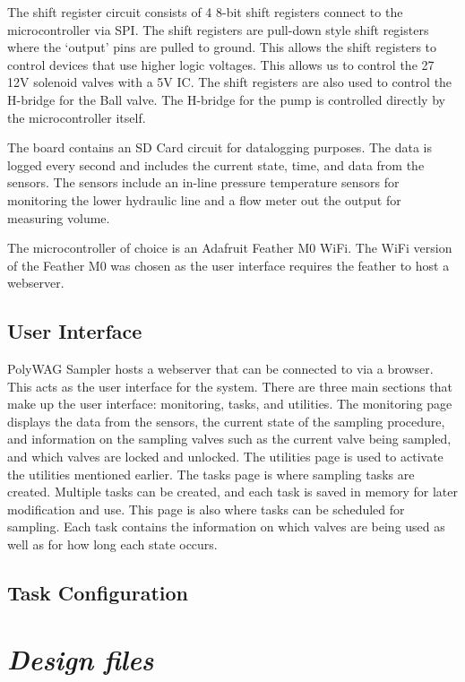 \documentclass[11pt, letterpaper]{article}
\begin{document}
The shift register circuit consists of 4 8-bit shift registers connect to the microcontroller via SPI. The shift registers are pull-down style shift registers where the ‘output’ pins are pulled to ground. This allows the shift registers to control devices that use higher logic voltages. This allows us to control the 27 12V solenoid valves with a 5V IC. The shift registers are also used to control the H-bridge for the Ball valve. The H-bridge for the pump is controlled directly by the microcontroller itself. 

The board contains an SD Card circuit for datalogging purposes. The data is logged every second and includes the current state, time, and data from the sensors. The sensors include an in-line pressure temperature sensors for monitoring the lower hydraulic line and a flow meter out the output for measuring volume.

The microcontroller of choice is an Adafruit Feather M0 WiFi. The WiFi version of the Feather M0 was chosen as the user interface requires the feather to host a webserver. 


\subsection{User Interface}

PolyWAG Sampler hosts a webserver that can be connected to via a browser. This acts as the user interface for the system. There are three main sections that make up the user interface: monitoring, tasks, and utilities. The monitoring page displays the data from the sensors, the current state of the sampling procedure, and information on the sampling valves such as the current valve being sampled, and which valves are locked and unlocked. The utilities page is used to activate the utilities mentioned earlier. The tasks page is where sampling tasks are created. Multiple tasks can be created, and each task is saved in memory for later modification and use. This page is also where tasks can be scheduled for sampling. Each task contains the information on which valves are being used as well as for how long each state occurs. 


\subsection{Task Configuration}



\section*{\textit{Design files}}
\end{document}
